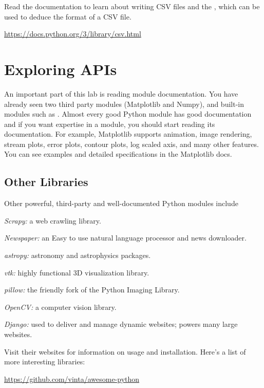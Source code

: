 \documentclass[11pt]{cselabheader}
\begin{document}
Read the documentation to learn about writing CSV files and the
, which can be used to deduce the format of
a CSV file.

\begin{center}
\url{https://docs.python.org/3/library/csv.html}
\end{center}

\section{Exploring APIs}
An important part of this lab is reading module documentation. You
have already seen two third party modules (Matplotlib and Numpy), and
built-in modules such as . Almost every good Python
module has good documentation and if you want expertise in a module,
you should start reading its documentation.  For example, Matplotlib
supports animation, image rendering, stream plots, error plots,
contour plots, log scaled axis, and many other features. You can see
examples and detailed specifications in the Matplotlib docs.

\subsection{Other Libraries}
Other powerful, third-party and well-documented Python modules include
\begin{inparaenum}
\item \textsl{Scrapy:} a web crawling library.
\item \textsl{Newspaper:} an Easy to use natural language processor and news downloader.
\item \textsl{astropy:} astronomy and astrophysics packages.
\item \textsl{vtk:} highly functional 3D visualization library.
\item \textsl{pillow:} the friendly fork of the Python Imaging Library.
\item \textsl{OpenCV:} a computer vision library.
\item \textsl{Django:} used to deliver and manage dynamic websites; powers many large websites.
\end{inparaenum}

Visit their websites for information on usage and installation.
Here's a list of more interesting libraries:
\begin{center}
\url{https://github.com/vinta/awesome-python}
\end{center}
\end{document}
